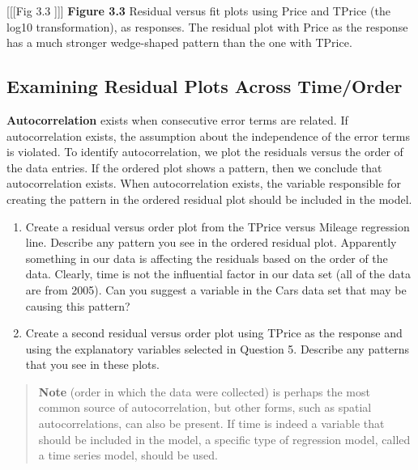 \documentclass[
]{report}
\theoremstyle{definition}
\theoremstyle{definition}
\theoremstyle{definition}
\theoremstyle{definition}
\theoremstyle{remark}
\begin{document}
{[}{[}{[}Fig 3.3 {]}{]}{]}
\textbf{Figure 3.3} Residual versus fit plots using Price and TPrice (the log10 transformation), as responses. The residual plot with Price as the response has a much stronger wedge-shaped pattern than the one with TPrice.

\hypertarget{examining-residual-plots-across-timeorder}{%
\subsection*{Examining Residual Plots Across Time/Order}\label{examining-residual-plots-across-timeorder}}

\textbf{Autocorrelation} exists when consecutive error terms are related. If autocorrelation exists, the assumption about the independence of the error terms is violated. To identify autocorrelation, we plot the residuals versus the order of the data entries. If the ordered plot shows a pattern, then we conclude that autocorrelation exists. When autocorrelation exists, the variable responsible for creating the pattern in the ordered residual plot should be included in the model.

\begin{enumerate}
\def\labelenumi{\arabic{enumi}.}
\setcounter{enumi}{8}
\item
  Create a residual versus order plot from the TPrice versus Mileage regression line. Describe any pattern you see in the ordered residual plot. Apparently something in our data is affecting the residuals based on the order of the data. Clearly, time is not the influential factor in our data set (all of the data are from 2005). Can you suggest a variable in the Cars data set that may be causing this pattern?
\item
  Create a second residual versus order plot using TPrice as the response and using the explanatory variables selected in Question 5. Describe any patterns that you see in these plots.
\end{enumerate}

\begin{quote}
\textbf{Note} (order in which the data were collected) is perhaps the most common source of autocorrelation, but other forms, such as spatial autocorrelations, can also be present. If time is indeed a variable that should be included in the model, a specific type of regression model, called a time series model, should be used.
\end{quote}
\end{document}
